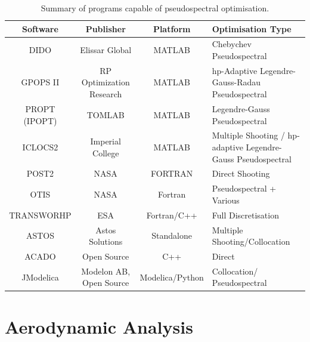 \begin{table}[ht]
	
	\begin{tabular}{|c|c|c| p{4cm}|}
		\hline \textbf{Software} & \textbf{Publisher} & \textbf{Platform} & \textbf{Optimisation Type} \\ 
		\hline DIDO\cite{Ross2002} & Elissar Global & MATLAB & Chebychev Pseudospectral \\ 
		\hline GPOPS II\cite{Rao2010} & RP Optimization Research & MATLAB & \textsf{hp}-Adaptive Legendre-Gauss-Radau Pseudospectral \\ 
		\hline PROPT (IPOPT)\cite{Rutquist2010}& TOMLAB & MATLAB & Legendre-Gauss  Pseudospectral  \\ 
		\hline ICLOCS2\cite{iclocs} & Imperial College & MATLAB &  Multiple Shooting / \textsf{hp}-adaptive Legendre-Gauss Pseudospectral  \\ 
		\hline POST2\cite{WilliamColson} & NASA & FORTRAN & Direct Shooting \\ 
		\hline OTIS\cite{otis} & NASA  & Fortran & Pseudospectral + Various  \\ 
		\hline TRANSWORHP\cite{Wassel2013} & ESA & Fortran/C++ & Full Discretisation \\ 
		\hline ASTOS\cite{astos} & Astos Solutions & Standalone & Multiple Shooting/Collocation  \\  
		\hline ACADO\cite{Houska2011} & Open Source & C++ &  Direct \\  
		\hline JModelica\cite{jmodelica} & Modelon AB, Open Source & Modelica/Python &  Collocation/ Pseudospectral \\  
		
		\hline 
	\end{tabular} 
	
	\caption{Summary of programs capable of pseudospectral optimisation.}
	\label{table:programs}
\end{table}















 







\section{Aerodynamic Analysis}

